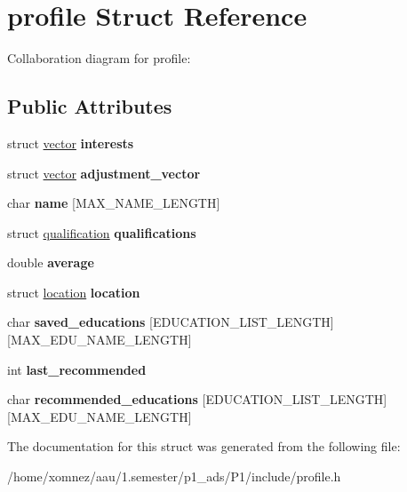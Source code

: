 \hypertarget{structprofile}{}\section{profile Struct Reference}
\label{structprofile}


Collaboration diagram for profile\+:
\subsection*{Public Attributes}
\begin{DoxyCompactItemize}
\item 
\mbox{\label{structprofile_a313de9760bb4abc3125aedcdc2d8e464}} 
struct \hyperlink{structvector}{vector} {\bfseries interests}
\item 
\mbox{\label{structprofile_a228b35200c8acd36c799e65fb9ee8c82}} 
struct \hyperlink{structvector}{vector} {\bfseries adjustment\+\_\+vector}
\item 
\mbox{\label{structprofile_aa5f452c2e28f63f9947b7c62d099ce9c}} 
char {\bfseries name} \mbox{[}M\+A\+X\+\_\+\+N\+A\+M\+E\+\_\+\+L\+E\+N\+G\+TH\mbox{]}
\item 
\mbox{\label{structprofile_ad4a90ac3791cc3a1fab5824fb9771ed5}} 
struct \hyperlink{structqualification}{qualification} {\bfseries qualifications}
\item 
\mbox{\label{structprofile_a1c5f94e6a8da32cfef600b126dc5fccb}} 
double {\bfseries average}
\item 
\mbox{\label{structprofile_ae86aa2c5432de3cb2705d2269b2e1b86}} 
struct \hyperlink{structlocation}{location} {\bfseries location}
\item 
\mbox{\label{structprofile_a3761452afdcb4ead85f3c8162c08a87f}} 
char {\bfseries saved\+\_\+educations} \mbox{[}E\+D\+U\+C\+A\+T\+I\+O\+N\+\_\+\+L\+I\+S\+T\+\_\+\+L\+E\+N\+G\+TH\mbox{]}\mbox{[}M\+A\+X\+\_\+\+E\+D\+U\+\_\+\+N\+A\+M\+E\+\_\+\+L\+E\+N\+G\+TH\mbox{]}
\item 
\mbox{\label{structprofile_a642839ebfcadc7b5f50429830f573c85}} 
int {\bfseries last\+\_\+recommended}
\item 
\mbox{\label{structprofile_a2ad59943b1463691981170ca9391fdf4}} 
char {\bfseries recommended\+\_\+educations} \mbox{[}E\+D\+U\+C\+A\+T\+I\+O\+N\+\_\+\+L\+I\+S\+T\+\_\+\+L\+E\+N\+G\+TH\mbox{]}\mbox{[}M\+A\+X\+\_\+\+E\+D\+U\+\_\+\+N\+A\+M\+E\+\_\+\+L\+E\+N\+G\+TH\mbox{]}
\end{DoxyCompactItemize}


The documentation for this struct was generated from the following file\+:\begin{DoxyCompactItemize}
\item 
/home/xomnez/aau/1.\+semester/p1\+\_\+ads/\+P1/include/profile.\+h\end{DoxyCompactItemize}

